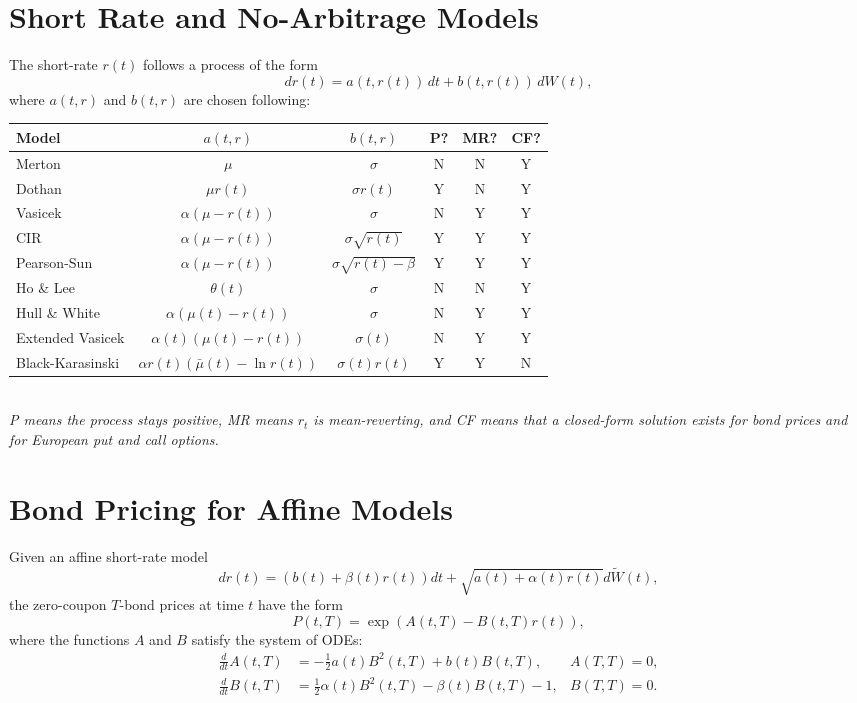\documentclass[twocolumn]{amsart}
\newcommand{\tW}{\widetilde W}
\begin{document}
\section*{Short Rate and No-Arbitrage Models}

The short-rate $r(t)$ follows a process of the form
\[ dr(t) = a(t,r(t))\,dt + b(t,r(t))\,dW(t),  \]
where $a(t,r)$ and $b(t,r)$ are chosen following:

\begin{tabular}{|lccccc|}
\hline
Model & $a(t,r)$ & $b(t,r)$ & P? & MR? & CF? \\
\hline
Merton & $\mu$ & $\sigma$ & N & N & Y \\
Dothan  &  $\mu r(t)$ & $\sigma r(t)$  & Y & N & Y \\
Vasicek  & $\alpha (\mu - r(t))$ & $\sigma$ & N & Y & Y \\
CIR  & $\alpha (\mu - r(t))$ & $\sigma \sqrt{r(t)}$& Y & Y & Y \\
Pearson-Sun & $\alpha(\mu - r(t))$ & $\sigma \sqrt{r(t)-\beta}$ & Y & Y & Y \\
Ho \& Lee &  $\theta(t)$ & $\sigma$  & N & N & Y \\
Hull \& White & $\alpha (\mu(t) - r(t))$ & $\sigma$ & N & Y & Y \\
Extended Vasicek & $\alpha(t) (\mu(t) - r(t))$ & $\sigma(t)$ & N & Y & Y \\
Black-Karasinski & $\alpha r(t) (\bar{\mu}(t) - \ln r(t))$ & $\sigma(t) r(t)$ & Y & Y & N\\
\hline
\end{tabular}\\

\emph{P means the process stays positive, MR means $r_t$ is mean-reverting, and
CF means that a closed-form solution exists for bond prices and for European
put and call options.}\\[1em]

\section*{Bond Pricing for Affine Models}

Given an affine short-rate model
\begin{equation*}
    dr(t) = (b(t) + \beta(t) r(t))dt+\sqrt{a(t) + \alpha(t) r(t)}d\tW(t),
\end{equation*}
the zero-coupon $T$-bond prices at time $t$ have the form
\begin{equation*}
    P(t,T) = \exp\left( A(t,T) - B(t,T) r(t) \right),
\end{equation*}
where the functions $A$ and $B$ satisfy the system of ODEs:
\begin{equation*}
    \begin{aligned}
        \frac{d}{dt} A(t,T) &= -\frac{1}{2} a(t) B^2(t,T) + b(t) B(t,T), &A(T,T) = 0,\\
        \frac{d}{dt} B(t,T) &= \frac12 \alpha(t) B^2(t,T) - \beta(t) B(t,T) - 1, & B(T,T) = 0.
    \end{aligned}
\end{equation*}
\end{document}

